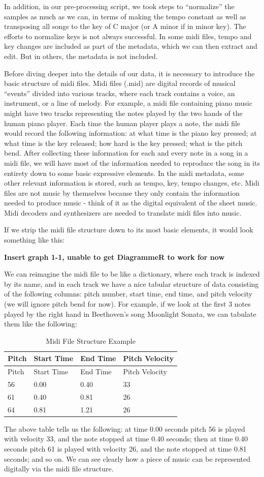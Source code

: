 \documentclass[12pt,oneside]{chicagocapstone}
\begin{document}
In addition, in our pre-processing script, we took steps to ``normalize'' the samples as much as we can, in terms of making the tempo constant as well as transposing all songs to the key of C major (or A minor if in minor key). The efforts to normalize keys is not always successful. In some midi files, tempo and key changes are included as part of the metadata, which we can then extract and edit. But in others, the metadata is not included.

Before diving deeper into the details of our data, it is necessary to introduce the basic structure of midi files. Midi files (.mid) are digital records of musical ``events'' divided into various tracks, where each track contains a voice, an instrument, or a line of melody. For example, a midi file containing piano music might have two tracks representing the notes played by the two hands of the human piano player. Each time the human player plays a note, the midi file would record the following information: at what time is the piano key pressed; at what time is the key released; how hard is the key pressed; what is the pitch bend. After collecting these information for each and every note in a song in a midi file, we will have most of the information needed to reproduce the song in its entirety down to some basic expressive elements. In the midi metadata, some other relevant information is stored, such as tempo, key, tempo changes, etc. Midi files are not music by themselves because they only contain the information needed to produce music - think of it as the digital equivalent of the sheet music. Midi decoders and synthesizers are needed to translate midi files into music.

If we strip the midi file structure down to its most basic elements, it would look something like this:

\textbf{Insert graph 1-1, unable to get DiagrammeR to work for now}

We can reimagine the midi file to be like a dictionary, where each track is indexed by its name, and in each track we have a nice tabular structure of data consisting of the following columns: pitch number, start time, end time, and pitch velocity (we will ignore pitch bend for now). For example, if we look at the first 3 notes played by the right hand in Beethoven's song Moonlight Sonata, we can tabulate them like the following:
\begin{longtable}[]{@{}llll@{}}
\caption{\label{tab:inher} Midi File Structure Example}\tabularnewline
\toprule
Pitch & Start Time & End Time & Pitch Velocity\tabularnewline
\midrule
\endfirsthead
\toprule
Pitch & Start Time & End Time & Pitch Velocity\tabularnewline
\midrule
\endhead
56 & 0.00 & 0.40 & 33\tabularnewline
61 & 0.40 & 0.81 & 26\tabularnewline
64 & 0.81 & 1.21 & 26\tabularnewline
\bottomrule
\end{longtable}
The above table tells us the following: at time 0.00 seconds pitch 56 is played with velocity 33, and the note stopped at time 0.40 seconds; then at time 0.40 seconds pitch 61 is played with velocity 26, and the note stopped at time 0.81 seconds; and so on. We can see clearly how a piece of music can be represented digitally via the midi file structure.
\end{document}
